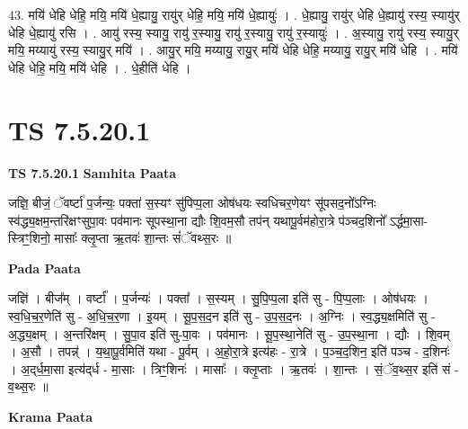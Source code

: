 \documentclass[17pt]{extarticle}
\begin{document}
43. मयि॑ धेहि धेहि॒ मयि॒ मयि॑ धे॒ह्यायु॒ रायु॑र् धेहि॒ मयि॒ मयि॑ धे॒ह्यायुः॑ । . धे॒ह्यायु॒ रायु॑र् धेहि धे॒ह्यायु॑ रस्य॒ स्यायु॑र् धेहि धे॒ह्यायु॑ रसि । . आयु॑ रस्य॒ स्यायु॒ रायु॑ र॒स्यायु॒ रायु॑ र॒स्यायु॒ रायु॑ र॒स्यायुः॑ । . अ॒स्यायु॒ रायु॑ रस्य॒ स्यायु॒र् मयि॒ मय्यायु॑ रस्य॒ स्यायु॒र् मयि॑ । . आयु॒र् मयि॒ मय्यायु॒ रायु॒र् मयि॑ धेहि धेहि॒ मय्यायु॒ रायु॒र् मयि॑ धेहि । . मयि॑ धेहि धेहि॒ मयि॒ मयि॑ धेहि । . धे॒हीति॑ धेहि । \newline
\pagebreak
{}

\section{ TS 7.5.20.1 }

\textbf{TS 7.5.20.1 } \newline
\textbf{Samhita Paata} \newline

जज्ञि॒ बीजं॒ ॅवर्ष्टा॑ प॒र्जन्यः॒ पक्ता॑ स॒स्यꣳ सु॑पिप्प॒ला ओष॑धयः स्वधिचर॒णेयꣳ सू॑पसद॒नो᳚ऽग्निः स्व॑द्ध्य॒क्षम॒न्तरि॑क्षꣳसुपा॒वः पव॑मानः सूपस्था॒ना द्यौः शि॒वम॒सौ तप॑न् यथापू॒र्वम॑होरा॒त्रे प॑ञ्चद॒शिनो᳚ ऽर्द्धमा॒सा-स्त्रिꣳ॒॒शिनो॒ मासाः᳚ क्लृ॒प्ता ऋ॒तवः॑ शा॒न्तः सं॑ॅवथ्स॒रः ॥ \newline

\textbf{Pada Paata} \newline

जज्ञि॑ । बीज᳚म् । वर्ष्टा᳚ । प॒र्जन्यः॑ । पक्ता᳚ । स॒स्यम् । सु॒पि॒प्प॒ला इति॑ सु - पि॒प्प॒लाः । ओष॑धयः । स्व॒धि॒च॒र॒णेति॑ सु - अ॒धि॒च॒र॒णा । इ॒यम् । सू॒प॒स॒द॒न इति॑ सु - उ॒प॒स॒द॒नः । अ॒ग्निः । स्व॒द्ध्य॒क्षमिति॑ सु - अ॒द्ध्य॒क्षम् । अ॒न्तरि॑क्षम् । सु॒पा॒व इति॑ सु-पा॒वः । पव॑मानः । सू॒प॒स्था॒नेति॑ सु - उ॒प॒स्था॒ना । द्यौः । शि॒वम् । अ॒सौ । तपन्न्॑ । य॒था॒पू॒र्वमिति॑ यथा - पू॒र्वम् । अ॒हो॒रा॒त्रे इत्य॑हः - रा॒त्रे । प॒ञ्च॒द॒शिन॒ इति॑ पञ्च - द॒शिनः॑ । अ॒द्‌र्ध॒मा॒सा इत्य॑द्‌र्ध - मा॒साः । त्रिꣳ॒॒शिनः॑ । मासाः᳚ । क्लृ॒प्ताः । ऋ॒तवः॑ । शा॒न्तः । सं॒ॅव॒थ्स॒र इति॑ सं - व॒थ्स॒रः ॥  \newline


\textbf{Krama Paata} \newline
\end{document}
